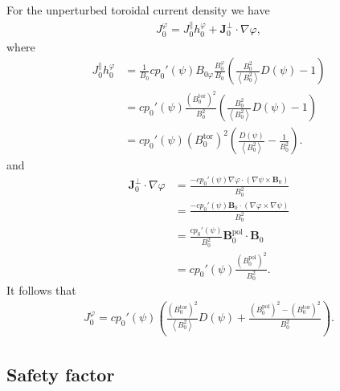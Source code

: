 \documentclass[a4paper, twoside, 10pt, english]{article}
\numberwithin{equation}{section}
\let\temp\varrho
\let\varrho\rho
\let\rho\temp
\let\temp\vartheta
\let\vartheta\theta
\let\theta\temp
\let\temp\varphi
\let\varphi\phi
\let\phi\temp
\let\vec\symbf
\newcommand*\grad{\ensuremath{\nabla}}
\newcommand*\pol{\ensuremath{\textrm{pol}}}  %
\newcommand*\tor{\ensuremath{\textrm{tor}}}  %
\begin{document}
For the unperturbed toroidal current density we have
\begin{gather}
  J_{0}^{\phi} = J_{0}^{\parallel} h_{0}^{\phi} + \vec{J}_{0}^{\perp} \cdot \grad \phi,
\end{gather}
where
\begin{align}
  J_{0}^{\parallel} h_{0}^{\phi} &= \frac{1}{B_{0}} c p_{0}'(\psi) B_{0 \phi} \frac{B_{0}^{\phi}}{B_{0}} \left( \frac{B_{0}^{2}}{\left\langle B_{0}^{2} \right\rangle} D(\psi) - 1 \right) \nonumber \\
  &= c p_{0}'(\psi) \frac{\left( B_{0}^{\tor} \right)^{2}}{B_0^2} \left( \frac{B_{0}^{2}}{\left\langle B_{0}^{2} \right\rangle} D(\psi) - 1 \right) \nonumber \\
  &= c p_{0}'(\psi) \left( B_{0}^{\tor} \right)^{2} \left( \frac{D(\psi)}{\left\langle B_{0}^{2} \right\rangle} - \frac{1}{B_{0}^{2}} \right).
\end{align}
and
\begin{align}
  \vec{J}_{0}^{\perp} \cdot \grad \phi &= \frac{-c p_{0}'(\psi) \grad \phi \cdot (\grad \psi \times \vec{B}_{0})}{B_{0}^{2}} \nonumber \\
  &= \frac{-c p_{0}'(\psi) \vec{B}_{0} \cdot (\grad \phi \times \grad \psi)}{B_{0}^{2}} \\
  &= \frac{c p_{0}'(\psi)}{B_{0}^{2}} \vec{B}_{0}^{\pol} \cdot \vec{B}_{0} \nonumber \\
  &= c p_{0}'(\psi) \frac{\left( B_{0}^{\pol} \right)^{2}}{B_{0}^{2}}.
\end{align}
It follows that
\begin{gather}
  J_{0}^{\phi} = c p_{0}'(\psi) \left( \frac{\left( B_{0}^{\tor} \right)^{2}}{\left\langle B_{0}^{2} \right\rangle} D(\psi) + \frac{\left( B_{0}^{\pol} \right)^2 - \left( B_{0}^{\tor} \right)^2}{B_{0}^{2}} \right).
\end{gather}

\subsection{Safety factor}
\label{sec:safety_factor}
\end{document}
